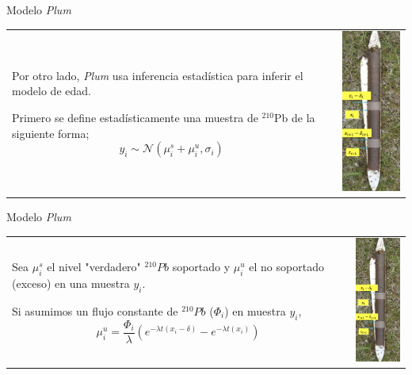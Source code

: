 \documentclass{beamer}
\begin{document}
\begin{frame}{Modelo \textit{Plum}}
	\begin{center}
		\begin{tabular}{p{7.51cm}p{2.51cm}}
			Por otro lado, {\itshape Plum} usa inferencia estadística para inferir el modelo de edad.

			Primero se define estadísticamente una muestra de $^{210}$Pb  de la siguiente forma; 
			$$y_i\sim \mathcal{N}\left(\mu_i^s +\mu_i^u ,\sigma_i \right)$$  
			& 
			\begin{minipage}{0.5\textwidth}
				\includegraphics[width=2.5cm]{./Figures/Core_Plum.png} 
			\end{minipage}
		\end{tabular}
	\end{center}
\end{frame} 

\begin{frame}{Modelo \textit{Plum} }
	\begin{center}
		\begin{tabular}{p{7.51cm}p{2.51cm}}
			Sea $\mu_i^s$ el nivel "verdadero" $^{210}Pb$ soportado y $\mu_i^u$ el no soportado (exceso) en una muestra $y_i$. 

			Si asumimos un flujo constante de $^{210}Pb$ ($\Phi_i$) en muestra $y_i$, 
			$$\mu_i^u = \frac{\Phi_i}{\lambda} \left(e^{-\lambda t(x_i-\delta)}- e^{-\lambda t(x_i)} \right) $$ 	
			&
			\begin{minipage}{0.85\textwidth}
				\includegraphics[width=2.5cm]{./Figures/Core_Plum.png} 
			\end{minipage}
		\end{tabular}
	\end{center}
\end{frame} 
\end{document}

